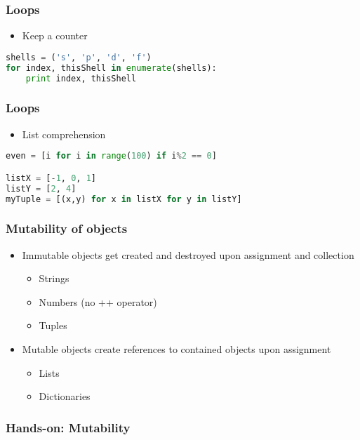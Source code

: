\documentclass[xcolor=table,10pt,final]{beamer}
\begin{document}
\begin{frame}[fragile]
  \frametitle{Loops}
  \begin{itemize}
    \item Keep a counter
  \end{itemize}
\begin{lstlisting}[language=Python]
shells = ('s', 'p', 'd', 'f')
for index, thisShell in enumerate(shells):
    print index, thisShell
    \end{lstlisting}
\end{frame}

\begin{frame}[fragile]
  \frametitle{Loops}
  \begin{itemize}
    \item List comprehension
  \end{itemize}
\begin{lstlisting}[language=Python]
even = [i for i in range(100) if i%2 == 0]

listX = [-1, 0, 1]
listY = [2, 4]
myTuple = [(x,y) for x in listX for y in listY]
\end{lstlisting}
\end{frame}




\begin{frame}[fragile]
  \frametitle{Mutability of objects}
  \begin{itemize}
    \item Immutable objects get created and destroyed upon assignment and collection
      \begin{itemize}
        \item Strings
        \item Numbers (no ++ operator)
        \item Tuples
      \end{itemize}
    \item Mutable objects create references to contained objects upon assignment
      \begin{itemize}
        \item Lists
        \item Dictionaries
      \end{itemize}
  \end{itemize}
\end{frame}

\begin{frame}
  \frametitle{Hands-on: Mutability}
\end{frame}
\end{document}
